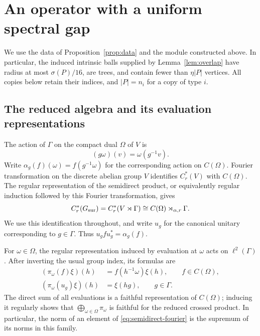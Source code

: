 \section{An operator with a uniform spectral gap}
\label{sec:spectrum}

We use the data of Proposition~\ref{prop:data} and the module constructed
above.  In particular, the induced intrinsic balls supplied by
Lemma~\ref{lem:overlap} have radius at most $\sigma(P)/16$, are trees,
and contain fewer than $\eta|P|$ vertices.  All copies below retain their
indices, and $|P|=n_i$ for a copy of type $i$.

\subsection{The reduced algebra and its evaluation representations}

The action of $\Gamma$ on the compact dual $\Omega$ of $V$ is
\[
 (g\omega)(v)=\omega(g^{-1}v).
\]
Write $\alpha_g(f)(\omega)=f(g^{-1}\omega)$ for the corresponding action
on $C(\Omega)$.  Fourier transformation on the discrete abelian group $V$
identifies $C_r^*(V)$ with $C(\Omega)$.  The regular representation of the
semidirect product, or equivalently regular induction followed by this
Fourier transformation, gives
\begin{equation}
 C_r^*(G_{\mathrm{sur}})=C_r^*(V\rtimes\Gamma)
 \cong C(\Omega)\rtimes_{\alpha,r}\Gamma.
 \label{eq:semidirect-fourier}
\end{equation}
We use this identification throughout, and write $u_g$ for the canonical
unitary corresponding to $g\in\Gamma$.  Thus
$u_gfu_g^*=\alpha_g(f)$.

For $\omega\in\Omega$, the regular representation induced by evaluation
at $\omega$ acts on $\ell^2(\Gamma)$.  After inverting the usual group
index, its formulas are
\begin{equation}
 \begin{split}
 (\pi_\omega(f)\xi)(h)&=f(h^{-1}\omega)\xi(h),\qquad f\in C(\Omega),\\
 (\pi_\omega(u_g)\xi)(h)&=\xi(hg),\qquad g\in\Gamma.
 \end{split}
 \label{eq:regular-evaluations}
\end{equation}
The direct sum of all evaluations is a faithful representation of
$C(\Omega)$; inducing it regularly shows that
$\bigoplus_{\omega\in\Omega}\pi_\omega$ is faithful for the reduced
crossed product.  In particular, the norm of an element of
\eqref{eq:semidirect-fourier} is the supremum of its norms in this family.

